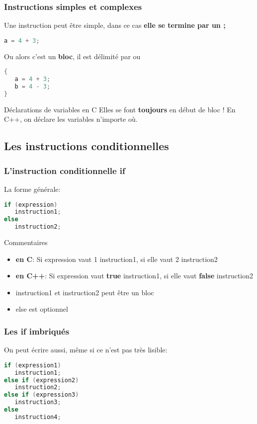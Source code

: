 \documentclass{beamer}
\begin{document}
\begin{frame}[fragile=singleslide,shrink=20]
\frametitle {Instructions simples et complexes}
Une instruction peut être simple, dans ce cas \textbf{elle se termine par un ;}
\begin{lstlisting}[language=c++]
a = 4 + 3;
\end{lstlisting}
Ou alors c'est un \textbf{bloc}, il est délimité par { ou }
\begin{lstlisting}[language=c++]
{
   a = 4 + 3;
   b = 4 - 3;
}
\end{lstlisting}
\begin{block}{Déclarations de variables en C}
Elles se font \textbf{toujours} en début de bloc !
En C++, on déclare les variables n'importe où.
\end{block}
\end{frame}

\subsection{Les instructions conditionnelles}

\begin{frame}[fragile=singleslide,shrink=20]
\frametitle {L'instruction conditionnelle if}

La forme générale:
\begin{lstlisting}[language=c++]
if (expression) 
   instruction1;
else
   instruction2;
\end{lstlisting}

\begin{block}{Commentaires}
\begin{itemize}
\item{\textbf{en C}: Si expression vaut 1 instruction1, si elle vaut 2 instruction2}
\item{\textbf{en C++}: Si expression vaut \textbf{true} instruction1, si elle vaut \textbf{false} instruction2}
\item{instruction1 et instruction2 peut être un bloc}
\item{else est optionnel}
\end{itemize}
\end{block}
\end{frame}

\begin{frame}[fragile=singleslide,shrink=20]
\frametitle {Les if imbriqués}

On peut écrire aussi, même si ce n'est pas très lisible:
\begin{lstlisting}[language=c++]
if (expression1) 
   instruction1;
else if (expression2)
   instruction2;
else if (expression3)
   instruction3;
else
   instruction4;
\end{lstlisting}
\end{frame}
\end{document}

